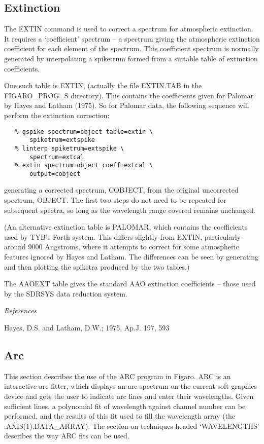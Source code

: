 \subsection{Extinction}

The EXTIN command is used to correct a spectrum
for atmospheric extinction.  It requires a `coefficient' spectrum --
a spectrum giving the atmospheric extinction coefficient for each
element of the spectrum.  This coefficient spectrum is normally
generated by interpolating a spike\-trum formed from a suitable table
of extinction coefficients.

One such table is EXTIN, (actually the file EXTIN.TAB in the
FIGARO\_PROG\_S directory).  This contains the coefficients given for
Palomar by Hayes and Latham (1975).  So for Palomar data, the following
sequence will perform the extinction correction:

\begin{verbatim}
   % gspike spectrum=object table=extin \
       spiketrum=extspike
   % linterp spiketrum=extspike \
       spectrum=extcal
   % extin spectrum=object coeff=extcal \
       output=cobject
\end{verbatim}

generating a corrected spectrum, COBJECT, from the original uncorrected
spectrum, OBJECT.  The first two steps do not need to be repeated for
subsequent spectra, so long as the wavelength range covered remains
unchanged.

(An alternative extinction table is PALOMAR, which contains the
coefficients used by TYB's Forth system.  This differs slightly from
EXTIN, particularly around 9000 Angstroms, where it attempts to
correct for some atmospheric features ignored by Hayes and Latham.
The differences can be seen by generating and then plotting the spiketra
produced by the two tables.)   

The AAOEXT table gives the standard AAO
extinction coefficients -- those used by the SDRSYS data reduction system.


\goodbreak
\vspace{12pt}
{\it References}

Hayes, D.S. and Latham, D.W.; 1975, Ap.J. 197, 593


\subsection{Arc}

This section describes the use of the ARC program in Figaro.  ARC
is an interactive arc fitter, which displays an arc spectrum on the
current soft graphics device and gets the user to indicate arc lines and
enter their wavelengths.  Given sufficient lines, a polynomial fit of
wavelength against channel number can be performed, and the results of
this fit used to fill the wavelength array (the .AXIS(1).DATA\_ARRAY).  The
section on techniques headed `WAVELENGTHS' describes the way ARC fits
can be used.

